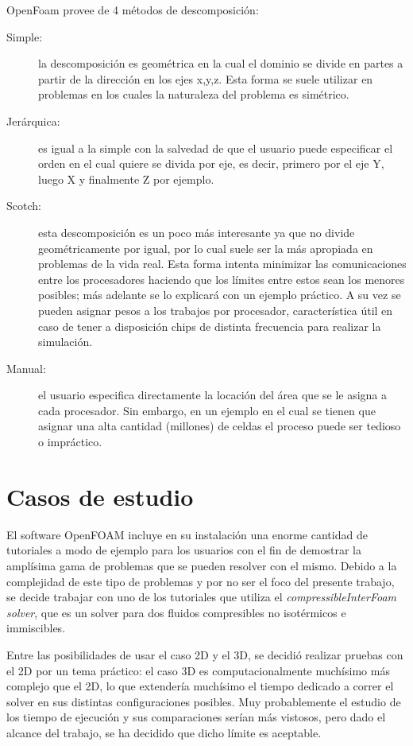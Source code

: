 \documentclass{article}
\begin{document}
\begin{description}
        OpenFoam provee de 4 métodos de descomposición:
        \begin{description}
            \item [Simple:] la descomposición es geométrica en la cual el dominio se divide en partes a partir de la dirección en los ejes x,y,z. Esta forma se suele utilizar en problemas en los cuales la naturaleza del problema es simétrico.
            \item [Jerárquica:] es igual a la simple con la salvedad de que el usuario puede especificar el orden en el cual quiere se divida por eje, es decir, primero por el eje Y, luego X y finalmente Z por ejemplo.
            \item [Scotch:] esta descomposición es un poco más interesante ya que no divide geométricamente por igual, por lo cual suele ser la más apropiada en problemas de la vida real. Esta forma intenta minimizar las comunicaciones entre los procesadores haciendo que los límites entre estos sean los menores posibles; más adelante se lo explicará con un ejemplo práctico. A su vez se pueden asignar pesos a los trabajos por procesador, característica útil en caso de tener a disposición chips de distinta frecuencia para realizar la simulación.
            \item [Manual:] el usuario especifica directamente la locación del área que se le asigna a cada procesador. Sin embargo, en un ejemplo en el cual se tienen que asignar una alta cantidad (millones) de celdas el proceso puede ser tedioso o impráctico.
        \end{description}

\end{description}

\newpage
\section{Casos de estudio}
El software OpenFOAM incluye en su instalación una enorme cantidad de tutoriales a modo de ejemplo para los usuarios con el fin de demostrar la amplísima gama de problemas que se pueden resolver con el mismo. Debido a la complejidad de este tipo de problemas y por no ser el foco del presente trabajo, se decide trabajar con uno de los tutoriales que utiliza el \textit{compressibleInterFoam solver}, que es un solver para dos fluidos compresibles no isotérmicos e immiscibles.

Entre las posibilidades de usar el caso 2D y el 3D, se decidió realizar pruebas con el 2D por un tema práctico: el caso 3D es computacionalmente muchísimo más complejo que el 2D, lo que extendería muchísimo el tiempo dedicado a correr el solver en sus distintas configuraciones posibles. Muy probablemente el estudio de los tiempo de ejecución y sus comparaciones serían más vistosos, pero dado el alcance del trabajo, se ha decidido que dicho límite es aceptable.
\end{document}
